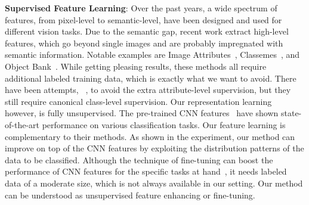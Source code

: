 \documentclass[preprint,12pt,3p]{elsarticle}
\begin{document}
\textbf{Supervised Feature Learning}: Over the past years, a wide spectrum of
features, from pixel-level to semantic-level, have been designed and
used for different vision tasks. Due to the semantic gap, recent work
extract high-level features, which go beyond single images and are
probably impregnated with semantic information. Notable examples are
Image Attributes~\citep{ObjectAttribute:cvpr09},
Classemes~\citep{eccv10:classemes}, and Object
Bank~\citep{li:objectbank}. While getting pleasing results, these
methods all require additional labeled training data, which is exactly
what we want to avoid.  There have been
attempts, \eg~\citep{augmented_attribute:eccv12, design_attribute:cvpr13}, to
avoid the extra attribute-level supervision, but they still require
canonical class-level supervision. Our representation learning
however, is fully unsupervised.  
The pre-trained CNN features~\citep{nips12:cnn, caffe14, rich:feature:cvpr14, deep:bmvc14}
have shown state-of-the-art performance on various classification tasks. Our feature 
learning is complementary to their methods. As shown in the experiment, our method can improve on top of 
the CNN features by exploiting the distribution patterns of the data to be classified.  
Although the technique of fine-tuning can 
boost the performance of CNN features for 
the specific tasks at hand~\citep{midlevel:transfer, cnn:transferable}, it needs labeled data of a moderate size, 
which is not always available in our setting.
Our method can be understood as unsupervised feature enhancing or fine-tuning.
\end{document}
